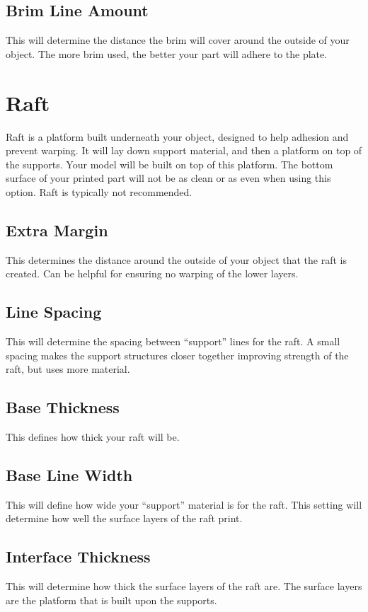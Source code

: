 \subsection{Brim Line Amount}
This will determine the distance the brim will cover around the outside of your object. The more brim used, the better your part will adhere to the plate. 

\section{Raft}
Raft is a platform built underneath your object, designed to help adhesion and prevent warping. It will lay down support material, and then a platform on top of the supports. Your model will be built on top of this platform. The bottom surface of your printed part will not be as clean or as even when using this option. Raft is typically not recommended.

\subsection{Extra Margin}
This determines the distance around the outside of your object that the raft is created. Can be helpful for ensuring no warping of the lower layers.

\subsection{Line Spacing}
This will determine the spacing between “support” lines for the raft. A small spacing makes the support structures closer together improving strength of the raft, but uses more material.

\subsection{Base Thickness}
This defines how thick your raft will be.

\subsection{Base Line Width}
This will define how wide your “support” material is for the raft. This setting will determine how well the surface layers of the raft print.

\subsection{Interface Thickness}
This will determine how thick the surface layers of the raft are. The surface layers are the platform that is built upon the supports.

